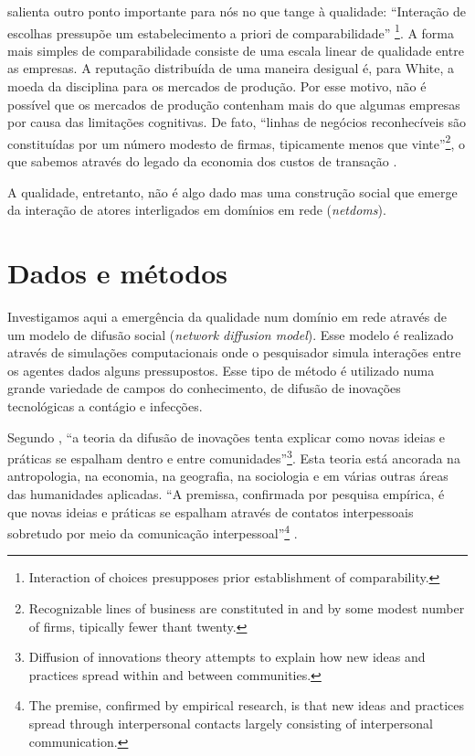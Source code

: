 \documentclass[a4paper, 12pt, openright, oneside, german, french, english, brazil]{abntex2}
\begin{document}
	 salienta outro ponto importante para nós no que tange à qualidade: ``Interação de escolhas pressupõe um estabelecimento a priori de comparabilidade''
	\footnote{Interaction of choices presupposes prior establishment of comparability.}. A forma mais simples de comparabilidade consiste de uma escala linear de qualidade entre as empresas. A reputação distribuída de uma maneira desigual é, para White, a moeda da disciplina para os mercados de produção. Por esse motivo, não é possível que os mercados de produção contenham mais do que algumas empresas por causa das limitações cognitivas. De fato, ``linhas de negócios reconhecíveis são constituídas por um número modesto de firmas, tipicamente menos que vinte''\footnote{Recognizable lines of business are constituted in and by some modest number of firms, tipically fewer thant twenty.}, o que sabemos através do legado da economia dos custos de transação .
	
	A qualidade, entretanto, não é algo dado mas uma construção social que emerge da interação de atores interligados em domínios em rede (\textit{netdoms}). 
	
	
	
	
	
	\section{Dados e métodos}
	
	Investigamos aqui a emergência da qualidade num domínio em rede através de um modelo de difusão social (\textit{network diffusion model}). Esse modelo é realizado através de simulações computacionais onde o pesquisador simula interações entre os agentes dados alguns pressupostos. Esse tipo de método é utilizado numa grande variedade de campos do conhecimento, de difusão de inovações tecnológicas a contágio e infecções.
	
	Segundo , ``a teoria da difusão de inovações tenta explicar como novas ideias e práticas se espalham dentro e entre comunidades''\footnote{Diffusion of innovations theory attempts to explain how new ideas and practices spread within and between communities.}. Esta teoria está ancorada na antropologia, na economia, na geografia, na sociologia e em várias outras áreas das humanidades aplicadas. ``A premissa, confirmada por pesquisa empírica, é que novas ideias e práticas se espalham através de contatos interpessoais sobretudo por meio da comunicação interpessoal''\footnote{The premise, confirmed by empirical research, is that new ideas and practices spread through interpersonal contacts largely consisting of interpersonal communication.} \cite{ryan1943diffusion,beal1955farm,katz1963traditions,valente1995network,valente1995origins,rogers2003diffusion}.
	
\end{document}
